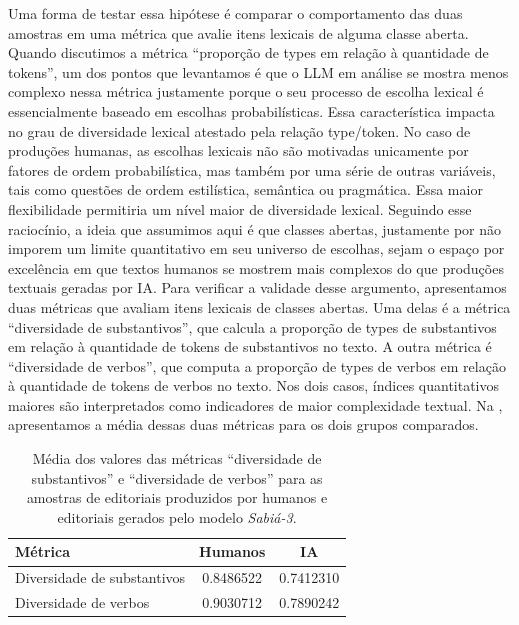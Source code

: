 \documentclass[portuguese]{textolivre}
\begin{document}
Uma forma de testar essa hipótese é comparar o comportamento das duas amostras em uma métrica que avalie itens lexicais de alguma classe aberta.
Quando discutimos a métrica ``proporção de types em relação à quantidade de tokens'', um dos pontos que levantamos é que o LLM em análise se mostra menos complexo nessa métrica justamente porque o seu processo de escolha lexical é essencialmente baseado em escolhas probabilísticas.
Essa característica impacta no grau de diversidade lexical atestado pela relação type/token.
No caso de produções humanas, as escolhas lexicais não são motivadas unicamente por fatores de ordem probabilística, mas também por uma série de outras variáveis, tais como questões de ordem estilística, semântica ou pragmática.
Essa maior flexibilidade permitiria um nível maior de diversidade lexical.
Seguindo esse raciocínio, a ideia que assumimos aqui é que classes abertas, justamente por não imporem um limite quantitativo em seu universo de escolhas, sejam o espaço por excelência em que textos humanos se mostrem mais complexos do que produções textuais geradas por IA.
Para verificar a validade desse argumento, apresentamos duas métricas que avaliam itens lexicais de classes abertas.
Uma delas é a métrica ``diversidade de substantivos'', que calcula a proporção de types de substantivos em relação à quantidade de tokens de substantivos no texto.
A outra métrica é ``diversidade de verbos'', que computa a proporção de types de verbos em relação à quantidade de tokens de verbos no texto.
Nos dois casos, índices quantitativos maiores são interpretados como indicadores de maior complexidade textual.
Na , apresentamos a média dessas duas métricas para os dois grupos comparados.

\begin{table}[htpb]
\centering
\begin{threeparttable}
\caption{Média dos valores das métricas ``diversidade de substantivos'' e ``diversidade de verbos'' para as amostras de editoriais produzidos por humanos e editoriais gerados pelo modelo \emph{Sabiá-3}.}
\label{tbl-tabela-03}
\begin{tabular}{lcc}
\toprule 
Métrica & Humanos & IA \\ 
\midrule
  Diversidade de substantivos & 0.8486522 & 0.7412310 \\
  Diversidade de verbos & 0.9030712 & 0.7890242 \\
\bottomrule
\end{tabular}
\end{threeparttable}
\end{table}
\end{document}
